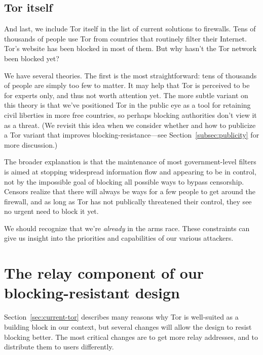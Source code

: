 \documentclass{llncs}
\begin{document}
\subsection{Tor itself}

And last, we include Tor itself in the list of current solutions
to firewalls. Tens of thousands of people use Tor from countries that
routinely filter their Internet. Tor's website has been blocked in most
of them. But why hasn't the Tor network been blocked yet?

We have several theories. The first is the most straightforward: tens of
thousands of people are simply too few to matter. It may help that Tor is
perceived to be for experts only, and thus not worth attention yet. The
more subtle variant on this theory is that we've positioned Tor in the
public eye as a tool for retaining civil liberties in more free countries,
so perhaps blocking authorities don't view it as a threat. (We revisit
this idea when we consider whether and how to publicize a Tor variant
that improves blocking-resistance---see Section~\ref{subsec:publicity}
for more discussion.)

The broader explanation is that the maintenance of most government-level
filters is aimed at stopping widespread information flow and appearing to be
in control, not by the impossible goal of blocking all possible ways to bypass
censorship. Censors realize that there will always
be ways for a few people to get around the firewall, and as long as Tor
has not publically threatened their control, they see no urgent need to
block it yet.

We should recognize that we're \emph{already} in the arms race. These
constraints can give us insight into the priorities and capabilities of
our various attackers.

\section{The relay component of our blocking-resistant design}
\label{sec:bridges}

Section~\ref{sec:current-tor} describes many reasons why Tor is
well-suited as a building block in our context, but several changes will
allow the design to resist blocking better. The most critical changes are
to get more relay addresses, and to distribute them to users differently.

\end{document}
